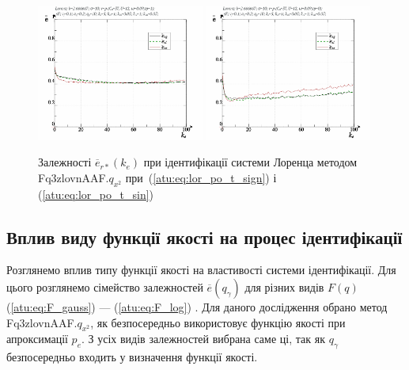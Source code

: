 \begin{figure}[ht!]
  \centerline{
    \includegraphics[width=0.49\textwidth]{p/cha/lor/Fq3zlovnAAF/lor_Fq3zlovnAAF_qx2-p_ke_e_sign.png}
    \hfill
    \includegraphics[width=0.49\textwidth]{p/cha/lor/Fq3zlovnAAF/lor_Fq3zlovnAAF_qx2-p_ke_e_sin.png}
  }
\caption{Залежності $ \overline{e}_{r *} (k_e) $ при ідентифікації системи Лоренца методом Fq3zlovnAAF.$q_{x^2} $ при~(\ref{atu:eq:lor_po_t_sign}) і (\ref{atu:eq:lor_po_t_sin})}
\label{atu:f:lor_ke_Fq3zlovnAAF.q_x2}
\end{figure}





\subsection{Вплив виду функції якості на процес ідентифікації}%

Розглянемо вплив типу функції якості на властивості системи
ідентифікації. Для цього розглянемо сімейство залежностей
$ \overline{e} (q_\gamma) $ для різних видів
$ F (q) $ (\ref{atu:eq:F_gauss}) --- (\ref{atu:eq:F_log}) . Для даного дослідження обрано
метод Fq3zlovnAAF.$q_{x^2} $, як безпосередньо використовує функцію якості при
апроксимації $ p_e $. З усіх видів залежностей вибрана саме ці, так як
$ q_\gamma $ безпосередньо входить у визначення функції якості.


